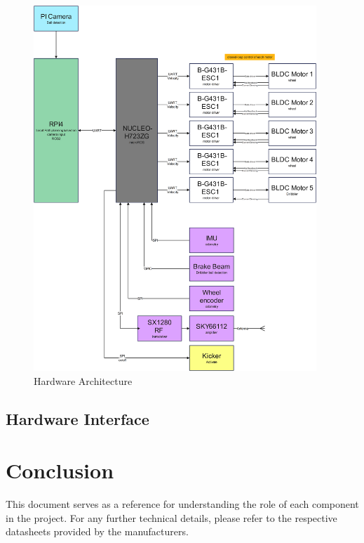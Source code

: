 \documentclass[a4paper,12pt]{article}
\begin{document}
  \begin{figure}[H]
    \begin{center}
      \includegraphics[width=0.95\textwidth]{Hardware_architecture.png}
    \end{center}
    \caption{Hardware Architecture}
    \label{fig:hardware_architecture}
  \end{figure}

  \subsection*{Hardware Interface}

  \section*{Conclusion}

  This document serves as a reference for understanding the role of each
  component in the project. For any further technical details, please
  refer to the respective datasheets provided by the manufacturers.

   
\end{document}
